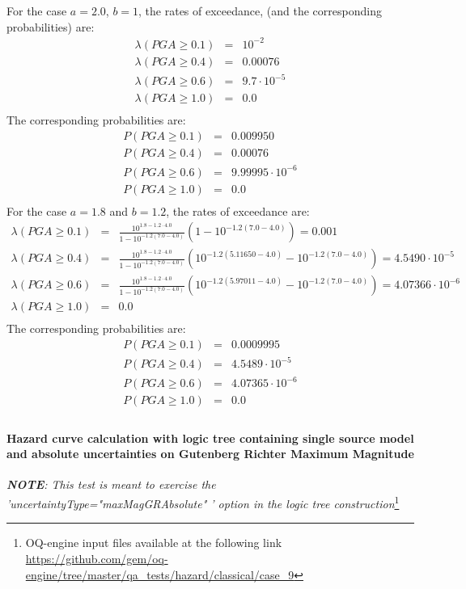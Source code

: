 For the case $a=2.0$, $b=1$, the rates of exceedance, (and the corresponding probabilities) are:
\begin{eqnarray}
\lambda(PGA \geq 0.1) &=& 10^{-2} \nonumber \\
\lambda(PGA \geq 0.4) &=& 0.00076 \nonumber \\
\lambda(PGA \geq 0.6) &=& 9.7\cdot 10^{-5} \nonumber \\
\lambda(PGA \geq 1.0) &=& 0.0 \nonumber \\
\end{eqnarray}
The corresponding probabilities are:
\begin{eqnarray}
P(PGA \geq 0.1) &=& 0.009950 \nonumber \\
P(PGA \geq 0.4) &=& 0.00076 \nonumber \\
P(PGA \geq 0.6) &=&  9.99995\cdot10^{-6} \nonumber \\
P(PGA \geq 1.0) &=&  0.0 \nonumber \\
\end{eqnarray}
For the case $a=1.8$ and $b=1.2$, the rates of exceedance are:
\begin{eqnarray}
\lambda(PGA \geq 0.1) &=& \frac{10^{1.8 - 1.2\cdot4.0}}{1 - 10^{-1.2(7.0 - 4.0)}}(1 - 10^{-1.2(7.0 - 4.0)})  = 0.001 \nonumber \\
\lambda(PGA \geq 0.4) &=& \frac{10^{1.8 - 1.2\cdot4.0}}{1 - 10^{-1.2(7.0 - 4.0)}}(10^{-1.2(5.11650-4.0)} - 10^{-1.2(7.0 - 4.0)}) = 4.5490\cdot 10^{-5} \nonumber \\
\lambda(PGA \geq 0.6) &=& \frac{10^{1.8 - 1.2\cdot4.0}}{1 - 10^{-1.2(7.0 - 4.0)}}(10^{-1.2(5.97011-4.0)} - 10^{-1.2(7.0 - 4.0)}) = 4.07366\cdot 10^{-6} \nonumber \\
\lambda(PGA \geq 1.0) &=& 0.0 \nonumber \\
\end{eqnarray}
The corresponding probabilities are:
\begin{eqnarray}
P(PGA \geq 0.1) &=& 0.0009995\nonumber \\
P(PGA \geq 0.4) &=& 4.5489\cdot 10^{-5}\nonumber \\
P(PGA \geq 0.6) &=& 4.07365\cdot 10^{-6}\nonumber \\
P(PGA \geq 1.0) &=& 0.0\nonumber \\
\end{eqnarray}
%
\clearpage
%
\paragraph{Hazard curve calculation with logic tree containing single
source model and absolute uncertainties on Gutenberg Richter Maximum Magnitude}
%
\textit{\textbf{NOTE}: This test is meant to exercise the
'uncertaintyType="maxMagGRAbsolute" ' option in the logic tree construction}\footnote{
    OQ-engine input files available at the following link
    \url{https://github.com/gem/oq-engine/tree/master/qa_tests/hazard/classical/case_9}
    }

